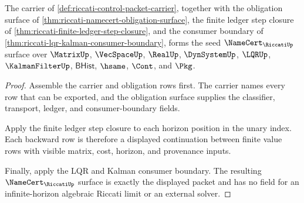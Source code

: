 \begin{theorem}
\label{thm:riccati-seed-namecert-surface}
The carrier of \autoref{def:riccati-control-packet-carrier}, together with the
obligation surface of \autoref{thm:riccati-namecert-obligation-surface}, the
finite ledger step closure of
\autoref{thm:riccati-finite-ledger-step-closure}, and the consumer boundary of
\autoref{thm:riccati-lqr-kalman-consumer-boundary}, forms the seed
$\NameCert_{\RiccatiUp}$ surface over $\MatrixUp$, $\VecSpaceUp$, $\RealUp$,
$\DynSystemUp$, $\LQRUp$, $\KalmanFilterUp$, $\mathsf{BHist}$, $\hsame$,
$\Cont$, and $\Pkg$.
\end{theorem}
\begin{proof}
Assemble the carrier and obligation rows first. The carrier names every row that
can be exported, and the obligation surface supplies the classifier, transport,
ledger, and consumer-boundary fields.

Apply the finite ledger step closure to each horizon position in the unary
index. Each backward row is therefore a displayed continuation between finite
value rows with visible matrix, cost, horizon, and provenance inputs.

Finally, apply the LQR and Kalman consumer boundary. The resulting
$\NameCert_{\RiccatiUp}$ surface is exactly the displayed packet and has no field
for an infinite-horizon algebraic Riccati limit or an external solver.
\end{proof}

